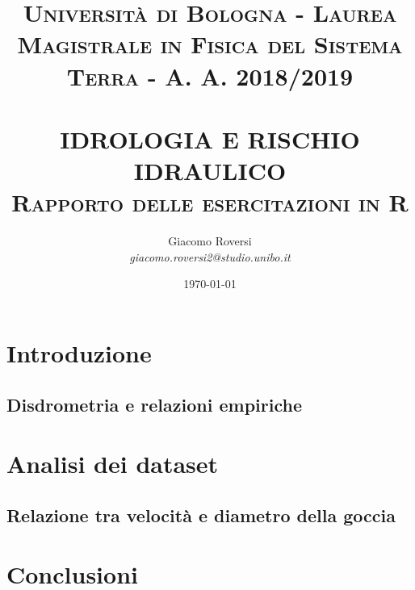 \documentclass[DIV=12, BCOR=0pt]{scrartcl}  %
\title{
    \normalfont \small %
    \scshape{Università di Bologna - Laurea Magistrale in Fisica del Sistema Terra - A. A. 2018/2019} \\ [7pt]   %
    \horrule{0.495pt} \\[0.3cm]  %
    \Large IDROLOGIA E RISCHIO IDRAULICO\\
    \huge Rapporto delle esercitazioni in R    %
    \horrule{0.495pt} \\         %
}
\author{
	Giacomo Roversi\\ 						%
	\normalsize\itshape{giacomo.roversi2@studio.unibo.it}
}
\date{\large\today}  						%
\begin{document}
    \maketitle       %
    
    \section{Introduzione}
    
    \subsection{Disdrometria e relazioni empiriche}
    
    \newpage
    \section{Analisi dei dataset}
    \subsection{Relazione tra velocità e diametro della goccia}

    \newpage
    \section{Conclusioni}
\end{document}
